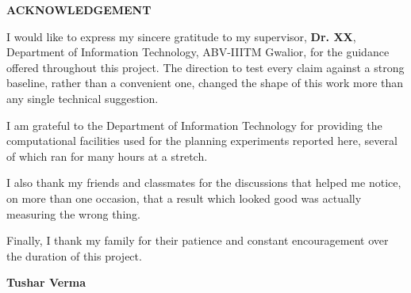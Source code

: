 
\begin{center}
{\Large \bf ACKNOWLEDGEMENT}
\end{center}
\vspace{0.5cm}

\noindent I would like to express my sincere gratitude to my supervisor, \textbf{Dr. XX}, Department of Information Technology, ABV-IIITM Gwalior, for the guidance offered throughout this project. The direction to test every claim against a strong baseline, rather than a convenient one, changed the shape of this work more than any single technical suggestion.

\vspace{0.3cm}
\noindent I am grateful to the Department of Information Technology for providing the computational facilities used for the planning experiments reported here, several of which ran for many hours at a stretch.

\vspace{0.3cm}
\noindent I also thank my friends and classmates for the discussions that helped me notice, on more than one occasion, that a result which looked good was actually measuring the wrong thing.

\vspace{0.3cm}
\noindent Finally, I thank my family for their patience and constant encouragement over the duration of this project.

\vspace{1.5cm}
\begin{flushright}
\textbf{Tushar Verma}
\end{flushright}
